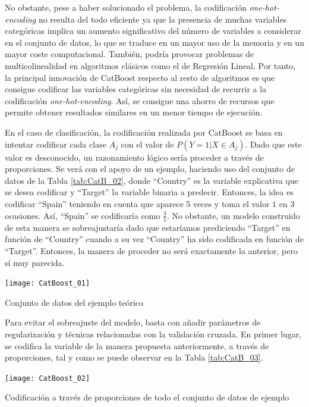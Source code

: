 \documentclass[12pt,twoside]{article}
\begin{document}
No obstante, pese a haber solucionado el problema, la codificación \textit{one-hot-encoding} no resulta del todo eficiente ya que la presencia de muchas variables categóricas implica un aumento significativo del número de variables a considerar en el conjunto de datos, lo que se traduce en un mayor uso de la memoria y en un mayor coste computacional. También, podría provocar problemas de multicolinealidad en algoritmos clásicos como el de Regresión Lineal. Por tanto, la principal innovación de CatBoost respecto al resto de algoritmos es que consigue codificar las variables categóricas sin necesidad de recurrir a la codificación \textit{one-hot-encoding}. Así, se consigue una ahorro de recursos que permite obtener resultados similares en un menor tiempo de ejecución.

En el caso de clasificación, la codificación realizada por CatBoost se basa en intentar codificar cada clase $A_j$ con el valor de $P(Y = 1 | X \in A_j)$. Dado que este valor es desconocido, un razonamiento lógico sería proceder a través de proporciones. Se verá con el apoyo de un ejemplo, haciendo uso del conjunto de datos de la Tabla \ref{tab:CatB_02}, donde ``Country'' es la variable explicativa que se desea codificar y ``Target'' la variable binaria a predecir. Entonces, la idea es codificar ``Spain'' teniendo en cuenta que aparece 5 veces y toma el valor $1$ en 3 ocasiones. Así, ``Spain'' se codificaría como $\frac{3}{5}$. No obstante, un modelo construido de esta manera se sobreajustaría dado que estaríamos prediciendo ``Target'' en función de ``Country'' cuando a su vez ``Country'' ha sido codificada en función de ``Target''. Entonces, la manera de proceder no será exactamente la anterior, pero sí muy parecida.

\begin{table}[h]
\centering
\texttt{[image: CatBoost\_01]}
\caption{Conjunto de datos del ejemplo teórico}
\label{tab:CatB_02}
\end{table}

Para evitar el sobreajuste del modelo, basta con añadir parámetros de regularización y técnicas relacionadas con la validación cruzada. En primer lugar, se codifica la variable de la manera propuesta anteriormente, a través de proporciones, tal y como se puede observar en la Tabla \ref{tab:CatB_03}.
\begin{table}[H]
\centering
\texttt{[image: CatBoost\_02]}
\caption{Codificación a través de proporciones de todo el conjunto de datos de ejemplo}
\label{tab:CatB_03}
\end{table}
\end{document}
